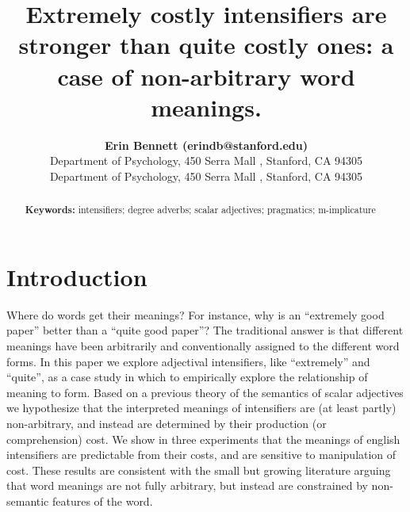 \documentclass[10pt,letterpaper]{article}
\title{Extremely costly intensifiers are stronger than quite costly ones: a case of non-arbitrary word meanings.}
\author{{\large \bf Erin Bennett (erindb@stanford.edu)} \\
  Department of Psychology, 450 Serra Mall , Stanford, CA 94305
  \AND {\large \bf Noah Goodman (ngoodman@stanford.edu)} \\
  Department of Psychology, 450 Serra Mall , Stanford, CA 94305}
\begin{document}
\maketitle


\begin{abstract}


\textbf{Keywords:} 
intensifiers; degree adverbs; scalar adjectives; pragmatics; m-implicature
\end{abstract}


\section{Introduction}


Where do words get their meanings? For instance, why is an ``extremely good paper'' better than a ``quite good paper''? The traditional answer \cite{saussure} is that different meanings have been arbitrarily and conventionally assigned to the different word forms.
In this paper we explore adjectival intensifiers, like ``extremely'' and ``quite'', as a case study in which to empirically explore the relationship of meaning to form.
Based on a previous theory of the semantics of scalar adjectives we hypothesize that the interpreted meanings of intensifiers are (at least partly) non-arbitrary, and instead are determined by their production (or comprehension) cost. 
We show in three experiments that the meanings of english intensifiers are predictable from their costs, and are sensitive to manipulation of cost.
These results are consistent with the small but growing literature arguing that word meanings are not fully arbitrary, but instead are constrained by non-semantic features of the word. 

\end{document}
